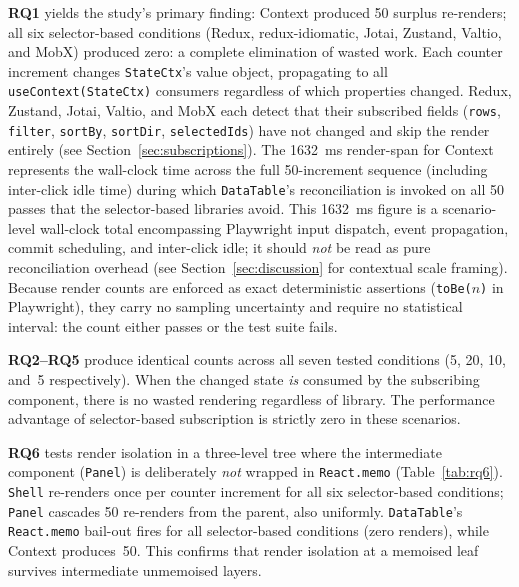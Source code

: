 \documentclass[conference]{IEEEtran}
\newcommand{\code}[1]{\texttt{\small #1}}
\begin{document}
\textbf{RQ1} yields the study's primary finding: Context produced 50
surplus re-renders; all six selector-based conditions (Redux,
redux-idiomatic, Jotai, Zustand, Valtio, and MobX) produced
zero: a complete elimination of wasted work. Each counter increment
changes \code{StateCtx}'s value object, propagating to all
\code{useContext(StateCtx)} consumers regardless of which properties
changed. Redux, Zustand, Jotai, Valtio, and MobX each detect that
their subscribed
fields (\code{rows}, \code{filter}, \code{sortBy}, \code{sortDir},
\code{selectedIds}) have not changed and skip the render entirely (see
Section~\ref{sec:subscriptions}). The 1632~ms render-span for Context
represents the wall-clock time across the full 50-increment sequence
(including inter-click idle time) during which \code{DataTable}'s
reconciliation is invoked on all 50 passes that the selector-based
libraries avoid.  This 1632~ms figure is a scenario-level wall-clock
total encompassing Playwright input dispatch, event propagation, commit
scheduling, and inter-click idle; it should \emph{not} be read as pure
reconciliation overhead (see Section~\ref{sec:discussion} for
contextual scale framing).
Because render counts are enforced as exact deterministic assertions
(\code{toBe($n$)} in Playwright), they carry no sampling uncertainty
and require no statistical interval: the count either passes or the
test suite fails.

\textbf{RQ2--RQ5} produce identical counts across all seven tested
conditions (5, 20, 10, and~5 respectively). When the changed state
\emph{is} consumed by the subscribing component, there is no wasted
rendering regardless of library. The performance advantage of
selector-based subscription is strictly zero in these scenarios.

\textbf{RQ6} tests render isolation in a three-level tree where the
intermediate component (\code{Panel}) is deliberately \emph{not} wrapped
in \code{React.memo} (Table~\ref{tab:rq6}). \code{Shell} re-renders once
per counter increment for all six selector-based conditions;
\code{Panel} cascades 50 re-renders from the parent, also uniformly.
\code{DataTable}'s \code{React.memo} bail-out fires for all
selector-based conditions (zero renders), while Context produces~50.
This confirms that render isolation at a memoised leaf survives
intermediate unmemoised layers.
\end{document}
